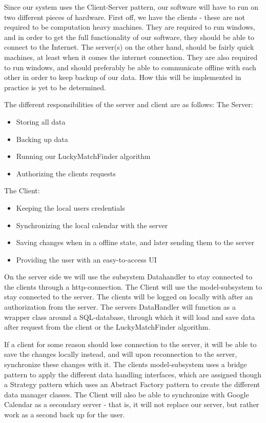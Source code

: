 Since our system uses the Client-Server pattern, our software will have to run on two different pieces of hardware. First off, we have the clients - these are not required to be computation heavy machines. They are required to run windows, and in order to get the full functionality of our software, they should be able to connect to the Internet. 
The server(s) on the other hand, should be fairly quick machines, at least when it comes the internet connection. They are also required to run windows, and should preferably be able to communicate offline with each other in order to keep backup of our data. How this will be implemented in practice is yet to be determined. 

The different responsibilities of the server and client are as follows:
The Server:
\begin{itemize}
	\item Storing all data
	\item Backing up data
	\item Running our LuckyMatchFinder algorithm
	\item Authorizing the clients requests
\end{itemize}
The Client:
\begin{itemize}
	\item Keeping the local users credentials
	\item Synchronizing the local calendar with the server
	\item Saving changes when in a offline state, and later sending them to the server
	\item Providing the user with an easy-to-access UI
\end{itemize}

On the server side we will use the subsystem Datahandler to stay connected to the clients through a http-connection. The Client will use the model-subsystem to stay connected to the server. The clients will be logged on locally with after an authorization from the server.
The servers DataHandler will function as a wrapper class around a SQL-database, through which it will load and save data after request from the client or the LuckyMatchFinder algorithm. 

If a client for some reason should lose connection to the server, it will be able to save the changes locally instead, and will upon reconnection to the server, synchronize these changes with it. The clients model-subsystem uses a bridge pattern to apply the different data handling interfaces, which are assigned though a Strategy pattern which uses an Abstract Factory pattern to create the different data manager classes. 
The Client will also be able to synchronize with Google Calendar as a secondary server - that is, it will not replace our server, but rather work as a second back up for the user. 